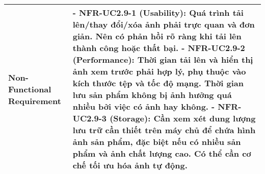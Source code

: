 \begin{longtable}{|m{4cm}|p{11cm}|}
\hline
Non-Functional Requirement & - \textbf{NFR-UC2.9-1 (Usability):} Quá trình tải lên/thay đổi/xóa ảnh phải trực quan và đơn giản. Nên có phản hồi rõ ràng khi tải lên thành công hoặc thất bại. \newline - \textbf{NFR-UC2.9-2 (Performance):} Thời gian tải lên và hiển thị ảnh xem trước phải hợp lý, phụ thuộc vào kích thước tệp và tốc độ mạng. Thời gian lưu sản phẩm không bị ảnh hưởng quá nhiều bởi việc có ảnh hay không. \newline - \textbf{NFR-UC2.9-3 (Storage):} Cần xem xét dung lượng lưu trữ cần thiết trên máy chủ để chứa hình ảnh sản phẩm, đặc biệt nếu có nhiều sản phẩm và ảnh chất lượng cao. Có thể cần cơ chế tối ưu hóa ảnh tự động. \\
\hline

\end{longtable}



